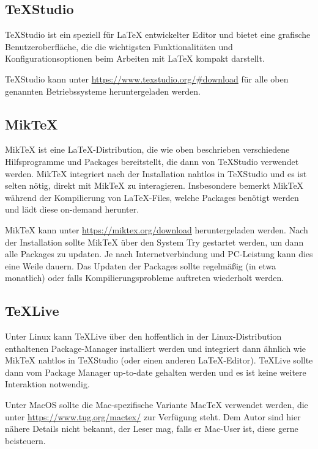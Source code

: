 \subsection{TeXStudio}
TeXStudio ist ein speziell für \LaTeX{} entwickelter Editor und bietet eine grafische Benutzeroberfläche, die die wichtigsten Funktionalitäten und Konfigurationsoptionen beim Arbeiten mit \LaTeX{} kompakt darstellt.

TeXStudio kann unter \url{https://www.texstudio.org/#download} für alle oben genannten Betriebssysteme heruntergeladen werden.

\subsection{MikTeX}
MikTeX ist eine \LaTeX -Distribution, die wie oben beschrieben verschiedene Hilfsprogramme und Packages bereitstellt, die dann von TeXStudio verwendet werden.
MikTeX integriert nach der Installation nahtlos in TeXStudio und es ist selten nötig, direkt mit MikTeX zu interagieren.
Insbesondere bemerkt MikTeX während der Kompilierung von \LaTeX -Files, welche Packages benötigt werden und lädt diese on-demand herunter.

MikTeX kann unter \url{https://miktex.org/download} heruntergeladen werden.
Nach der Installation sollte MikTeX über den System Try gestartet werden, um dann alle Packages zu updaten.
Je nach Internetverbindung und PC-Leistung kann dies eine Weile dauern.
Das Updaten der Packages sollte regelmäßig (in etwa monatlich) oder falls Kompilierungsprobleme auftreten wiederholt werden.

\subsection{TeXLive}
Unter Linux kann TeXLive über den hoffentlich in der Linux-Distribution enthaltenen Package-Manager installiert werden und integriert dann ähnlich wie MikTeX nahtlos in TeXStudio (oder einen anderen \LaTeX -Editor).
TeXLive sollte dann vom Package Manager up-to-date gehalten werden und es ist keine weitere Interaktion notwendig.

Unter MacOS sollte die Mac-spezifische Variante MacTeX verwendet werden, die unter \url{https://www.tug.org/mactex/} zur Verfügung steht.
Dem Autor sind hier nähere Details nicht bekannt, der Leser mag, falls er Mac-User ist, diese gerne beisteuern.


